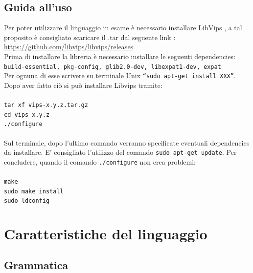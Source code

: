 \documentclass[10pt]{article}
\begin{document}
\subsection{Guida all'uso}
Per poter utilizzare il linguaggio in esame è necessario installare LibVips \cite{lipvips}, a tal proposito è consigliato scaricare il .tar dal seguente link : \url{https://github.com/libvips/libvips/releases}\\
Prima di installare la libreria è necessario installare le seguenti dependencies: \\
\texttt{build-essential, pkg-config, glib2.0-dev, libexpat1-dev, expat}
\\ Per ognuna di esse scrivere su terminale Unix \texttt{“sudo apt-get install XXX”}. Dopo aver fatto ciò si può installare Libvips tramite:\\\\
\texttt{tar xf vips-x.y.z.tar.gz}\\
\texttt{cd vips-x.y.z}\\
\texttt{./configure}\\\\
Sul terminale, dopo l’ultimo comando verranno specificate eventuali dependencies da installare. E' consigliato l'utilizzo del comando \texttt{sudo apt-get update}. Per concludere, quando il comando \texttt{./configure} non crea problemi:\\\\
\texttt{make}\\
\texttt{sudo make install}\\
\texttt{sudo ldconfig}\\
\clearpage
\section{Caratteristiche del linguaggio} 
\subsection{Grammatica}
\end{document}
